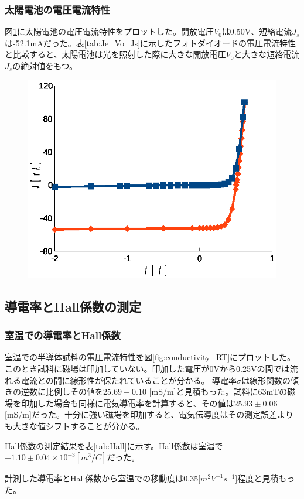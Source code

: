 \documentclass[11pt,a4]{jarticle}
\begin{document}
\subsubsection{太陽電池の電圧電流特性}
図\ref{fig:solor_cell}に太陽電池の電圧電流特性をプロットした。開放電圧$V_0$は0.50V、短絡電流$J_s$は-52.1mAだった。表\ref{tab:Je_Vo_Js}に示したフォトダイオードの電圧電流特性と比較すると、太陽電池は光を照射した際に大きな開放電圧$V_0$と大きな短絡電流$J_s$の絶対値をもつ。
 \begin{figure}[!htbp]
   \begin{center}
    \includegraphics[width=0.6\hsize]{./solor_cell.eps}
    \caption{}
     \label{fig:solor_cell}
   \end{center}
\end{figure}

\subsection{導電率とHall係数の測定}

\subsubsection{室温での導電率とHall係数}
室温での半導体試料の電圧電流特性を図\ref{fig:conductivity_RT}にプロットした。このとき試料に磁場は印加していない。印加した電圧が0Vから0.25Vの間では流れる電流との間に線形性が保たれていることが分かる。
導電率$\sigma$は線形関数の傾きの逆数に比例しその値を$25.69\pm0.10$ [mS/m]と見積もった。試料に63mTの磁場を印加した場合も同様に電気導電率を計算すると、その値は$25.93\pm0.06$ [mS/m]だった。十分に強い磁場を印加すると、電気伝導度はその測定誤差よりも大きな値シフトすることが分かる。

Hall係数の測定結果を表\ref{tab:Hall}に示す。Hall係数は室温で$-1.10\pm0.04\times10^{-3}[m^3/C]$だった。

計測した導電率とHall係数から室温での移動度は0.35[$m^2V^{-1}s^{-1}$]程度と見積もった。
\end{document}
